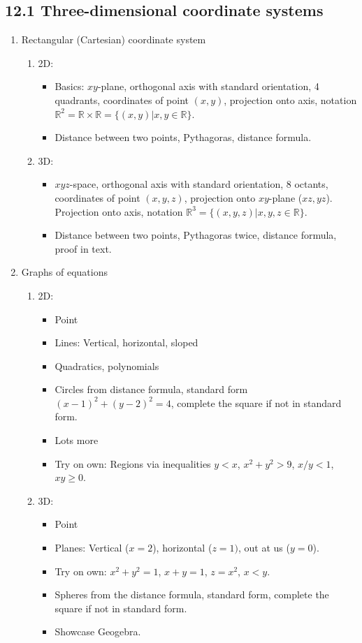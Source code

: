 \documentclass{article}
\begin{document}
\subsection{12.1 Three-dimensional coordinate systems}
\begin{enumerate}
\item Rectangular (Cartesian) coordinate system
\begin{enumerate}
\item 2D: 
\begin{itemize}
\item Basics: $xy$-plane, orthogonal axis with standard orientation, 4 quadrants, coordinates of point $(x,y)$, projection onto axis, notation $\mathbb{R}^2 = \mathbb{R} \times \mathbb{R} = \{ (x,y) | x,y \in \mathbb{R} \}$.
\item Distance between two points, Pythagoras, distance formula.
\end{itemize} 

\item 3D: 
\begin{itemize}
\item $xyz$-space, orthogonal axis with standard orientation, 8 octants, coordinates of point $(x,y,z)$, projection onto $xy$-plane ($xz,yz$). Projection onto axis,  notation $\mathbb{R}^3 = \{ (x,y,z) | x,y,z \in \mathbb{R} \}$.
\item Distance between two points, Pythagoras twice, distance formula, proof in text.
\end{itemize}
\end{enumerate}

\item Graphs of equations
\begin{enumerate}
\item 2D: 
\begin{itemize}
\item Point
\item Lines: Vertical, horizontal, sloped
\item Quadratics, polynomials
\item Circles from distance formula, standard form $(x-1)^2+(y-2)^2=4$, complete the square if not in standard form.
\item Lots more
\item Try on own: Regions via inequalities $y<x$, $x^2+y^2>9$, $x/y<1$, $xy\geq0$.
\end{itemize}
\item 3D: 
\begin{itemize}
\item Point
\item Planes: Vertical ($x=2$), horizontal ($z=1)$, out at us ($y=0$).
\item Try on own: $x^2+y^2=1$, $x+y=1$, $z=x^2$, $x<y$.
\item Spheres from the distance formula, standard form, complete the square if not in standard form.
\item Showcase Geogebra.
\end{itemize}
\end{enumerate}


\end{enumerate}
\end{document}
